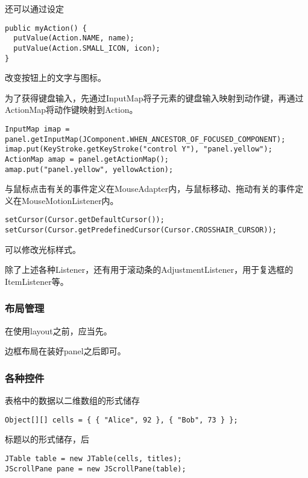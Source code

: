 \documentclass{ctexart}
\begin{document}
还可以通过设定
\begin{lstlisting}
public myAction() {
  putValue(Action.NAME, name);
  putValue(Action.SMALL_ICON, icon);
}
\end{lstlisting}
改变按钮上的文字与图标。
\par
为了获得键盘输入，先通过InputMap将子元素的键盘输入映射到动作键，再通过ActionMap将动作键映射到Action。
\begin{lstlisting}
InputMap imap = panel.getInputMap(JComponent.WHEN_ANCESTOR_OF_FOCUSED_COMPONENT);
imap.put(KeyStroke.getKeyStroke("control Y"), "panel.yellow");
ActionMap amap = panel.getActionMap();
amap.put("panel.yellow", yellowAction);
\end{lstlisting}
与鼠标点击有关的事件定义在MouseAdapter内，与鼠标移动、拖动有关的事件定义在MouseMotionListener内。
\begin{lstlisting}
setCursor(Cursor.getDefaultCursor());
setCursor(Cursor.getPredefinedCursor(Cursor.CROSSHAIR_CURSOR));
\end{lstlisting}
可以修改光标样式。
\par
除了上述各种Listener，还有用于滚动条的AdjustmentListener，用于复选框的ItemListener等。
\subsubsection*{布局管理}
在使用layout之前，应当先。
\par
边框布局在装好panel之后即可。
\subsubsection*{各种控件}
表格中的数据以二维数组的形式储存
\begin{lstlisting}
Object[][] cells = { { "Alice", 92 }, { "Bob", 73 } };
\end{lstlisting}
标题以的形式储存，后
\begin{lstlisting}
JTable table = new JTable(cells, titles);
JScrollPane pane = new JScrollPane(table);
\end{lstlisting}
\end{document}
